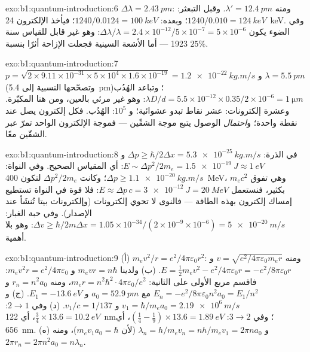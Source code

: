 \begin{solution}{exo:b1:quantum-introduction:6}
$\Delta\lambda = \qty{2.43}{pm}$: ومنه $\lambda' = \qty{12.4}{pm}$. وقبل التبعثر: $1240/0.010 =
\qty{124}{keV}$؛ وبعده: $1240/0.0124 = \qty{100}{keV}$؛ فيأخذ الإلكترون
\qty{24}{keV}. وفي الضوء يكون $\Delta\lambda/\lambda = 2.4 \times 10^{-12}/5 \times 10^{-7} = 5 \times
10^{-6}$: وهو غير قابل للقياس سنة 1923 --- أما الأشعة السينية فجعلت الإزاحة أثرًا بنسبة $25\%$.
\end{solution}

\begin{solution}{exo:b1:quantum-introduction:7}
$p = \sqrt{2 \times 9.11 \times 10^{-31} \times 5 \times 10^4 \times 1.6 \times 10^{-19}} =
\qty{1.2e-22}{kg.m/s}$ و $\lambda = \qty{5.5}{pm}$ (وتصحّحها النسبية إلى
\qty{5.4}{pm})؛ وتباعد الهُدُب $\lambda D/d = 5.5 \times 10^{-12} \times 0.35/2 \times 10^{-6}
= \qty{1}{\micro m}$: وهو غير مرئي بالعين، ومن هنا  المكبّرة. وعشرة
إلكترونات: عشر نقاط تبدو عشوائية؛ و $10^5$: الهُدُب. فكل
إلكترون يصل عند نقطة واحدة؛ و\emph{احتمال} الوصول يتبع
موجة الشقّين --- فموجة الإلكترون الواحد تمرّ عبر الشقّين معًا.
\end{solution}

\begin{solution}{exo:b1:quantum-introduction:8}
في الذرة: $\Delta p \geq \hbar/2\Delta x = \qty{5.3e-25}{kg.m/s}$ و $E \sim \Delta p^2/2m_e =
\qty{1.5e-19}{J} \approx \qty{1}{eV}$: أي المقياس الصحيح. وفي النواة: $\Delta p \geq
\qty{1.1e-20}{kg.m/s}$؛ وكانت $\Delta p^2/2m_e$ لتكون \qty{400}{MeV}، وهي تفوق
$m_ec^2$ بكثير، فنستعمل $E \approx \Delta p\,c = \qty{3e-12}{J} = \qty{20}{MeV}$: فلا قوة
في النواة تستطيع إمساك إلكترون بهذه الطاقة --- فالنوى لا تحوي
إلكترونات (وإلكترونات بيتا تُنشَأ عند الإصدار). وفي حبة الغبار: $\Delta v \geq
\hbar/2m\Delta x = 1.05 \times 10^{-34}/(2 \times 10^{-9} \times 10^{-6}) = \qty{5e-20}{m/s}$:
وهو بلا أهمية.
\end{solution}

\begin{solution}{exo:b1:quantum-introduction:9}
(أ) $m_ev^2/r = e^2/4\pi\varepsilon_0r^2$: ومنه $v = \sqrt{e^2/4\pi\varepsilon_0m_er}$ و $E =
\tfrac12m_ev^2 - e^2/4\pi\varepsilon_0r = -e^2/8\pi\varepsilon_0r$. (ب) ولدينا $m_evr = n\hbar$ و
$m_ev^2r = e^2/4\pi\varepsilon_0$: فاقسم مربع الأولى على الثانية:
$m_er = n^2\hbar^2 \cdot 4\pi\varepsilon_0/e^2$، ومنه $r_n = n^2a_0$ و $E_n = -e^2/8\pi\varepsilon_0n^2a_0
= E_1/n^2$ مع $a_0 = \qty{52.9}{pm}$ و $E_1 = \qty{-13.6}{eV}$. (ج) و $v_1 =
\hbar/m_ea_0 = \qty{2.19e6}{m/s}$ و $v_1/c = 1/137$. (د) وفي $2 \to 1$: $\tfrac34 \times
13.6 = \qty{10.2}{eV}$، أي \qty{122}{nm}؛ وفي $3 \to 2$: $(\tfrac14 - \tfrac19) \times 13.6 =
\qty{1.89}{eV}$، أي \qty{656}{nm}. (ه) و $\lambda_n = h/m_ev_n = nh/m_ev_1 = 2\pi na_0$
(لأن $m_ev_1a_0 = \hbar$)، ومنه $2\pi r_n = 2\pi n^2a_0 = n\lambda_n$.
\end{solution}

